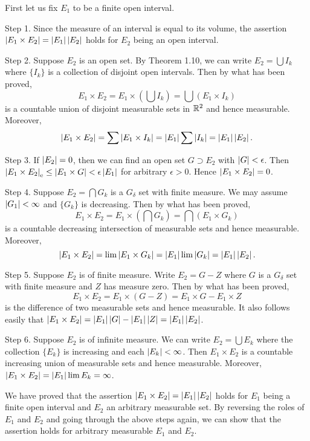 \begin{exercise}{3.12}
  First let us fix $E_1$ to be a finite open interval.

  Step 1.
  Since the measure of an interval is equal to its volume,
  the assertion $\left\vert E_1 \times E_2\right\vert = \left\vert E_1\right\vert \left\vert E_2\right\vert$ holds
  for $E_2$ being an open interval.

  Step 2.
  Suppose $E_2$ is an open set.
  By Theorem 1.10,
  we can write $E_2 = \bigcup I_k$
  where $\{I_k\}$ is a collection of disjoint open intervals.
  Then by what has been proved,
  \[
    E_1 \times E_2 = E_1 \times \left( \bigcup I_k \right)
    = \bigcup \left(E_1 \times I_k\right)
  \]
  is a countable union of disjoint measurable sets in $\mathbb{R}^2$
  and hence measurable.
  Moreover,
  \[
    \left\vert E_1 \times E_2\right\vert = \sum \left\vert E_1 \times I_k\right\vert
    = \left\vert E_1\right\vert \sum \left\vert I_k\right\vert = \left\vert E_1\right\vert \left\vert E_2\right\vert.
  \]

  Step 3. If $\left\vert E_2\right\vert = 0$, then we can find an open set $G \supset E_2$
  with $\left\vert G\right\vert < \epsilon$. Then
  $\left\vert E_1 \times E_2\right\vert_\mathrm{e} \le \left\vert E_1 \times G\right\vert < \epsilon \left\vert E_1\right\vert$
  for arbitrary $\epsilon > 0$.
  Hence $\left\vert E_1 \times E_2\right\vert = 0$.

  Step 4. Suppose $E_2 = \bigcap G_k$ is a $G_\delta$ set with finite measure.
  We may assume $\left\vert G_1\right\vert < \infty$ and $\{G_k\}$ is decreasing.
  Then by what has been proved,
  \[
    E_1 \times E_2 = E_1 \times \left( \bigcap G_k \right)
    = \bigcap \left( E_1 \times G_k \right)
  \]
  is a countable decreasing intersection of measurable sets
  and hence measurable.
  Moreover,
  \[
    \left\vert E_1 \times E_2\right\vert
    = \lim \left\vert E_1 \times G_k\right\vert
    = \left\vert E_1\right\vert \lim \left\vert G_k\right\vert = \left\vert E_1\right\vert \left\vert E_2\right\vert.
  \]

  Step 5. Suppose $E_2$ is of finite measure.
  Write $E_2 = G - Z$ where $G$ is a $G_{\delta}$ set with finite measure
  and $Z$ has measure zero. Then by what has been proved,
  \[
    E_1 \times E_2 = E_1 \times \left( G-Z \right)
    = E_1 \times G - E_1 \times Z
  \]
  is the difference of two measurable sets and hence measurable.
  It also follows easily that
  $\left\vert E_1 \times E_2\right\vert = \left\vert E_1\right\vert\left\vert G\right\vert - \left\vert E_1\right\vert\left\vert Z\right\vert = \left\vert E_1\right\vert\left\vert E_2\right\vert$.

  Step 6. Suppose $E_2$ is of infinite measure.
  We can write $E_2 = \bigcup E_k$
  where the collection $\{E_k\}$ is increasing and each $\left\vert E_k\right\vert < \infty$.
  Then $E_1 \times E_2$ is a countable increasing union of measurable sets
  and hence measurable.
  Moreover, $\left\vert E_1 \times E_2\right\vert = \left\vert E_1\right\vert \lim {E_k} = \infty$.

  We have proved that the assertion $\left\vert E_1 \times E_2\right\vert = \left\vert E_1\right\vert \left\vert E_2\right\vert$
  holds for $E_1$ being a finite open interval and $E_2$ an arbitrary measurable set.
  By reversing the roles of $E_1$ and $E_2$
  and going through the above steps again,
  we can show that the assertion holds for arbitrary measurable $E_1$ and $E_2$.
\end{exercise}


